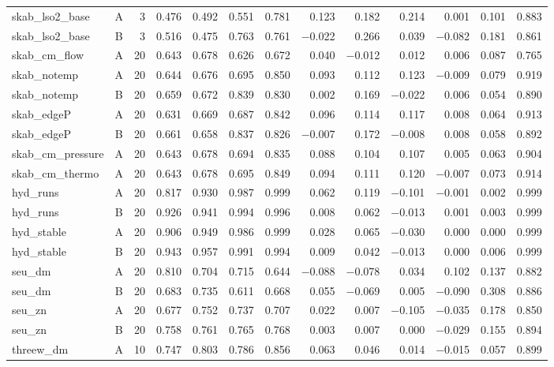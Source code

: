 \begin{tabular}{@{}l c r rrrrrrrrrr@{}}
skab\_lso2\_base & A & 3 & 0.476 & 0.492 & 0.551 & 0.781 & 0.123 & 0.182 & 0.214 & 0.001 & 0.101 & 0.883 \\
skab\_lso2\_base & B & 3 & 0.516 & 0.475 & 0.763 & 0.761 & $-$0.022 & 0.266 & 0.039 & $-$0.082 & 0.181 & 0.861 \\
skab\_cm\_flow & A & 20 & 0.643 & 0.678 & 0.626 & 0.672 & 0.040 & $-$0.012 & 0.012 & 0.006 & 0.087 & 0.765 \\
skab\_notemp & A & 20 & 0.644 & 0.676 & 0.695 & 0.850 & 0.093 & 0.112 & 0.123 & $-$0.009 & 0.079 & 0.919 \\
skab\_notemp & B & 20 & 0.659 & 0.672 & 0.839 & 0.830 & 0.002 & 0.169 & $-$0.022 & 0.006 & 0.054 & 0.890 \\
skab\_edgeP & A & 20 & 0.631 & 0.669 & 0.687 & 0.842 & 0.096 & 0.114 & 0.117 & 0.008 & 0.064 & 0.913 \\
skab\_edgeP & B & 20 & 0.661 & 0.658 & 0.837 & 0.826 & $-$0.007 & 0.172 & $-$0.008 & 0.008 & 0.058 & 0.892 \\
skab\_cm\_pressure & A & 20 & 0.643 & 0.678 & 0.694 & 0.835 & 0.088 & 0.104 & 0.107 & 0.005 & 0.063 & 0.904 \\
skab\_cm\_thermo & A & 20 & 0.643 & 0.678 & 0.695 & 0.849 & 0.094 & 0.111 & 0.120 & $-$0.007 & 0.073 & 0.914 \\
hyd\_runs & A & 20 & 0.817 & 0.930 & 0.987 & 0.999 & 0.062 & 0.119 & $-$0.101 & $-$0.001 & 0.002 & 0.999 \\
hyd\_runs & B & 20 & 0.926 & 0.941 & 0.994 & 0.996 & 0.008 & 0.062 & $-$0.013 & 0.001 & 0.003 & 0.999 \\
hyd\_stable & A & 20 & 0.906 & 0.949 & 0.986 & 0.999 & 0.028 & 0.065 & $-$0.030 & 0.000 & 0.000 & 0.999 \\
hyd\_stable & B & 20 & 0.943 & 0.957 & 0.991 & 0.994 & 0.009 & 0.042 & $-$0.013 & 0.000 & 0.006 & 0.999 \\
seu\_dm & A & 20 & 0.810 & 0.704 & 0.715 & 0.644 & $-$0.088 & $-$0.078 & 0.034 & 0.102 & 0.137 & 0.882 \\
seu\_dm & B & 20 & 0.683 & 0.735 & 0.611 & 0.668 & 0.055 & $-$0.069 & 0.005 & $-$0.090 & 0.308 & 0.886 \\
seu\_zn & A & 20 & 0.677 & 0.752 & 0.737 & 0.707 & 0.022 & 0.007 & $-$0.105 & $-$0.035 & 0.178 & 0.850 \\
seu\_zn & B & 20 & 0.758 & 0.761 & 0.765 & 0.768 & 0.003 & 0.007 & 0.000 & $-$0.029 & 0.155 & 0.894 \\
threew\_dm & A & 10 & 0.747 & 0.803 & 0.786 & 0.856 & 0.063 & 0.046 & 0.014 & $-$0.015 & 0.057 & 0.899 \\

\end{tabular}
